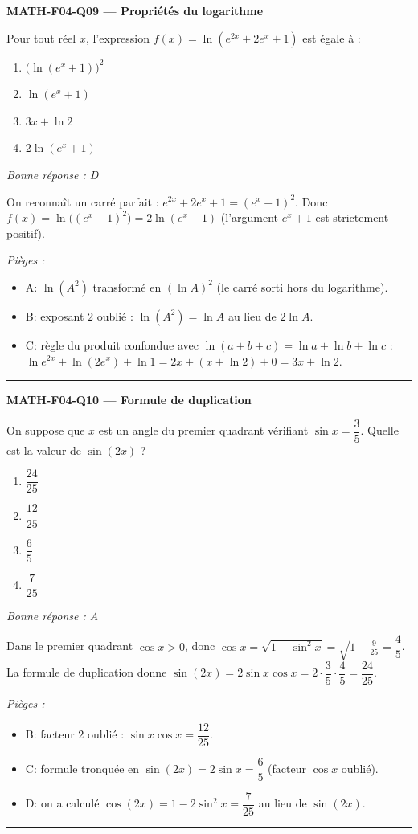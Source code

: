 \documentclass[11pt,a4paper]{article}
\begin{document}
\noindent\textbf{MATH-F04-Q09 --- Propriétés du logarithme}\par
Pour tout réel $x$, l'expression $f(x)=\ln\!\left(e^{2x}+2e^{x}+1\right)$ est égale à :
\begin{enumerate}[label=\Alph*)]
\item $\big(\ln(e^{x}+1)\big)^2$
\item $\ln(e^{x}+1)$
\item $3x+\ln 2$
\item $2\ln(e^{x}+1)$
\end{enumerate}
\textit{Bonne réponse : D}\par
On reconnaît un carré parfait : $e^{2x}+2e^{x}+1=(e^{x}+1)^2$. Donc $f(x)=\ln\!\big((e^{x}+1)^2\big)=2\ln(e^{x}+1)$ (l'argument $e^{x}+1$ est strictement positif).\par
\textit{Pièges :}
\begin{itemize}
\item A: $\ln(A^2)$ transformé en $(\ln A)^2$ (le carré sorti hors du logarithme).
\item B: exposant $2$ oublié : $\ln(A^2)=\ln A$ au lieu de $2\ln A$.
\item C: règle du produit confondue avec $\ln(a+b+c)=\ln a+\ln b+\ln c$ : $\ln e^{2x}+\ln(2e^{x})+\ln 1=2x+(x+\ln 2)+0=3x+\ln 2$.
\end{itemize}
\vspace{8pt}\hrule\vspace{8pt}

\noindent\textbf{MATH-F04-Q10 --- Formule de duplication}\par
On suppose que $x$ est un angle du premier quadrant vérifiant $\sin x=\dfrac{3}{5}$. Quelle est la valeur de $\sin(2x)$ ?
\begin{enumerate}[label=\Alph*)]
\item $\dfrac{24}{25}$
\item $\dfrac{12}{25}$
\item $\dfrac{6}{5}$
\item $\dfrac{7}{25}$
\end{enumerate}
\textit{Bonne réponse : A}\par
Dans le premier quadrant $\cos x>0$, donc $\cos x=\sqrt{1-\sin^2 x}=\sqrt{1-\tfrac{9}{25}}=\dfrac{4}{5}$. La formule de duplication donne $\sin(2x)=2\sin x\cos x=2\cdot\dfrac{3}{5}\cdot\dfrac{4}{5}=\dfrac{24}{25}$.\par
\textit{Pièges :}
\begin{itemize}
\item B: facteur $2$ oublié : $\sin x\cos x=\dfrac{12}{25}$.
\item C: formule tronquée en $\sin(2x)=2\sin x=\dfrac{6}{5}$ (facteur $\cos x$ oublié).
\item D: on a calculé $\cos(2x)=1-2\sin^2 x=\dfrac{7}{25}$ au lieu de $\sin(2x)$.
\end{itemize}
\vspace{8pt}\hrule\vspace{8pt}
\end{document}
